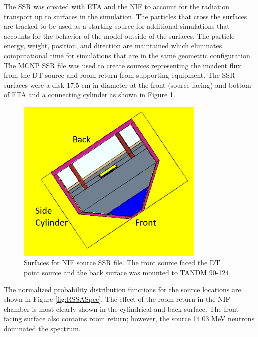 The SSR was created with ETA and the NIF to account for the radiation transport up to surfaces in the simulation. The particles that cross the surfaces are tracked to be used as a starting source for additional simulations that accounts for the behavior of the model outside of the surfaces. The particle energy, weight, position, and direction are maintained which eliminates computational time for simulations that are in the same geometric configuration. 
The MCNP SSR file was used to create sources representing the incident flux from the DT source and room return from supporting equipment.
The SSR surfaces were a disk 17.5 cm in diameter at the front (source facing) and bottom of ETA and a connecting cylinder as shown in Figure \ref{fig:sursource}. 

\begin{figure}[hbt!]
	\centering
	\includegraphics[width=9cm]{Figures/Chapter3/SurfacesSSR.png}
	\caption[Surfaces for NIF source SSR file.]{Surfaces for NIF source SSR file. The front source faced the DT point source and the back surface was mounted to TANDM 90-124.}
	\label{fig:sursource}
\end{figure}

The normalized probability distribution functions for the source locations are shown in Figure \ref{fig:RSSASpec}. 
The effect of the room return in the NIF chamber is most clearly shown in the cylindrical and back surface.  
The front-facing surface also contains room return; however, the source 14.03 MeV neutrons dominated the spectrum. 

